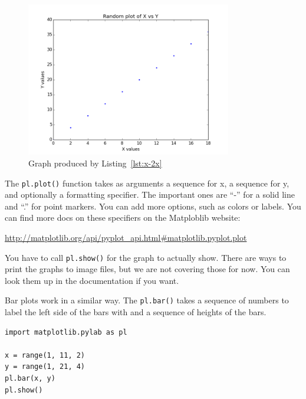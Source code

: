 \documentclass[11pt]{cselabheader}
\begin{document}
\begin{figure}[!ht]
  \centering
  \includegraphics[width=0.8\textwidth]{lab11/x-2x-plot.png}
  \caption{Graph produced by Listing~\ref{lst:x-2x}}
  \label{fig:x-2x}
\end{figure}

The \lstinline!pl.plot()! function takes as arguments a sequence for x, a
sequence for y, and optionally a formatting specifier. The important ones are
``-'' for a solid line and ``.'' for point markers. You can add more options,
such as colors or labels. You can find more docs on
these specifiers on the Matploblib website:
\begin{center}
  \url{http://matplotlib.org/api/pyplot_api.html#matplotlib.pyplot.plot}
\end{center}

You have to call \lstinline!pl.show()! for the graph to actually show. There are
ways to print the graphs to image files, but we are not covering those for now.
You can look them up in the documentation if you want.

Bar plots work in a similar way. The \lstinline!pl.bar()! takes a sequence of
numbers to label the left side of the bars with and a sequence of heights of the
bars.

\begin{lstlisting}[caption={Code to produce Figure~\ref{fig:x-2x-bar}},label={lst:x-2x-bar}]
import matplotlib.pylab as pl

x = range(1, 11, 2)
y = range(1, 21, 4)
pl.bar(x, y)
pl.show()
\end{lstlisting}
\end{document}
